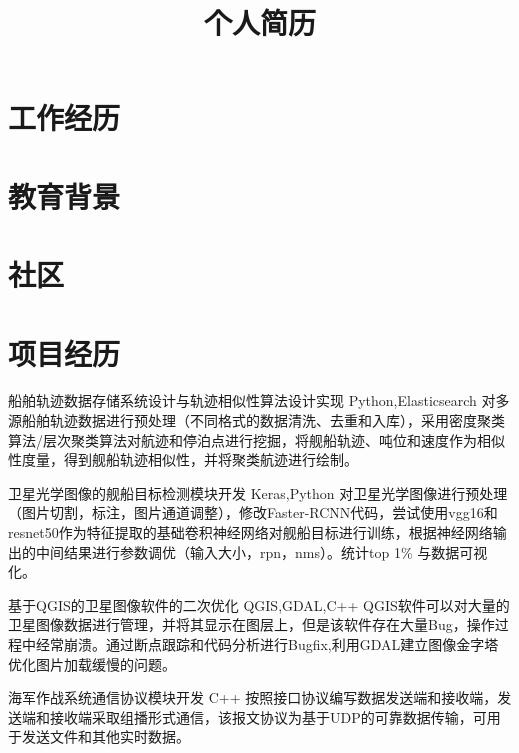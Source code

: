 \documentclass[11pt,a4paper]{moderncv}
\title{个人简历}                      %
\begin{document}
\maketitle

\section{工作经历}

\section{教育背景}


\section{社区}

\section{项目经历}
\renewcommand{\baselinestretch}{1.2}
{船舶轨迹数据存储系统设计与轨迹相似性算法设计实现}
{Python,Elasticsearch}
{}{}
{对多源船舶轨迹数据进行预处理（不同格式的数据清洗、去重和入库），采用密度聚类算法/层次聚类算法对航迹和停泊点进行挖掘，将舰船轨迹、吨位和速度作为相似性度量，得到舰船轨迹相似性，并将聚类航迹进行绘制。}

{卫星光学图像的舰船目标检测模块开发}
{Keras,Python}
{}{}
{对卫星光学图像进行预处理（图片切割，标注，图片通道调整），修改Faster-RCNN代码，尝试使用vgg16和resnet50作为特征提取的基础卷积神经网络对舰船目标进行训练，根据神经网络输出的中间结果进行参数调优（输入大小，rpn，nms）。统计top 1\% 与数据可视化。}

{基于QGIS的卫星图像软件的二次优化}
{QGIS,GDAL,C++}
{}{}
{QGIS软件可以对大量的卫星图像数据进行管理，并将其显示在图层上，但是该软件存在大量Bug，操作过程中经常崩溃。通过断点跟踪和代码分析进行Bugfix,利用GDAL建立图像金字塔优化图片加载缓慢的问题。}

{海军作战系统通信协议模块开发}
{C++}
{}{}
{按照接口协议编写数据发送端和接收端，发送端和接收端采取组播形式通信，该报文协议为基于UDP的可靠数据传输，可用于发送文件和其他实时数据。}
\end{document}
